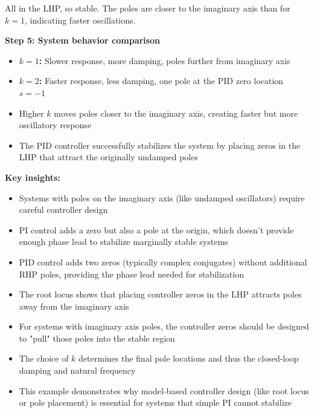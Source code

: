 \documentclass[11pt,a4paper]{article}
\begin{document}
All in the LHP, so stable. The poles are closer to the imaginary axis than for $k=1$, indicating faster oscillations.

\textbf{Step 5: System behavior comparison}

\begin{itemize}
\item \textbf{$k = 1$:} Slower response, more damping, poles further from imaginary axis
\item \textbf{$k = 2$:} Faster response, less damping, one pole at the PID zero location $s = -1$
\item Higher $k$ moves poles closer to the imaginary axis, creating faster but more oscillatory response
\item The PID controller successfully stabilizes the system by placing zeros in the LHP that attract the originally undamped poles
\end{itemize}

\textbf{Key insights:}
\begin{itemize}
\item Systems with poles on the imaginary axis (like undamped oscillators) require careful controller design
\item PI control adds a zero but also a pole at the origin, which doesn't provide enough phase lead to stabilize marginally stable systems
\item PID control adds two zeros (typically complex conjugates) without additional RHP poles, providing the phase lead needed for stabilization
\item The root locus shows that placing controller zeros in the LHP attracts poles away from the imaginary axis
\item For systems with imaginary axis poles, the controller zeros should be designed to "pull" those poles into the stable region
\item The choice of $k$ determines the final pole locations and thus the closed-loop damping and natural frequency
\item This example demonstrates why model-based controller design (like root locus or pole placement) is essential for systems that simple PI cannot stabilize
\end{itemize}
\end{document}
